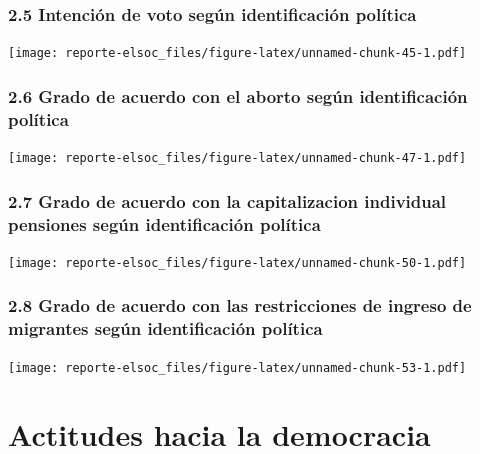 \documentclass[
  12pt,
  openany]{book}
\begin{document}
\hypertarget{intenciuxf3n-de-voto-seguxfan-identificaciuxf3n-poluxedtica}{%
\subsection{2.5 Intención de voto según identificación política}\label{intenciuxf3n-de-voto-seguxfan-identificaciuxf3n-poluxedtica}}

\texttt{[image: reporte-elsoc\_files/figure-latex/unnamed-chunk-45-1.pdf]}

\hypertarget{grado-de-acuerdo-con-el-aborto-seguxfan-identificaciuxf3n-poluxedtica}{%
\subsection{2.6 Grado de acuerdo con el aborto según identificación política}\label{grado-de-acuerdo-con-el-aborto-seguxfan-identificaciuxf3n-poluxedtica}}

\texttt{[image: reporte-elsoc\_files/figure-latex/unnamed-chunk-47-1.pdf]}

\hypertarget{grado-de-acuerdo-con-la-capitalizacion-individual-pensiones-seguxfan-identificaciuxf3n-poluxedtica}{%
\subsection{2.7 Grado de acuerdo con la capitalizacion individual pensiones según identificación política}\label{grado-de-acuerdo-con-la-capitalizacion-individual-pensiones-seguxfan-identificaciuxf3n-poluxedtica}}

\texttt{[image: reporte-elsoc\_files/figure-latex/unnamed-chunk-50-1.pdf]}

\hypertarget{grado-de-acuerdo-con-las-restricciones-de-ingreso-de-migrantes-seguxfan-identificaciuxf3n-poluxedtica}{%
\subsection{2.8 Grado de acuerdo con las restricciones de ingreso de migrantes según identificación política}\label{grado-de-acuerdo-con-las-restricciones-de-ingreso-de-migrantes-seguxfan-identificaciuxf3n-poluxedtica}}

\texttt{[image: reporte-elsoc\_files/figure-latex/unnamed-chunk-53-1.pdf]}

\hypertarget{actitudes-hacia-la-democracia}{%
\chapter{Actitudes hacia la democracia}\label{actitudes-hacia-la-democracia}}
\end{document}
